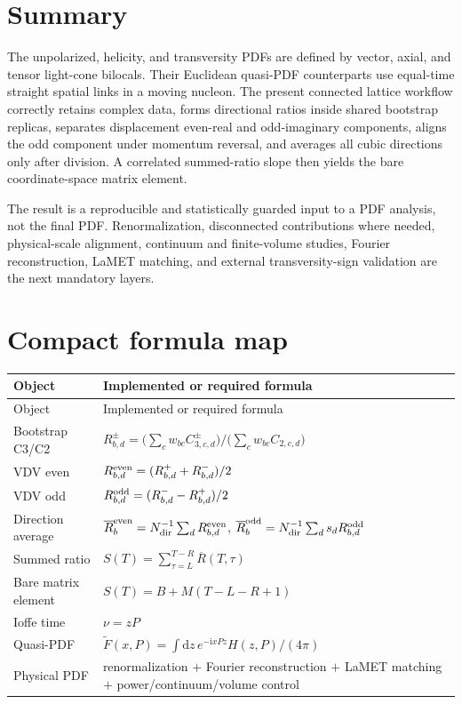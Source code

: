 \documentclass[11pt]{article}
\numberwithin{equation}{section}
\newcommand{\ii}{\mathrm{i}}
\newcommand{\dd}{\mathrm{d}}
\begin{document}
\section{Summary}

The unpolarized, helicity, and transversity PDFs are defined by vector, axial,
and tensor light-cone bilocals.  Their Euclidean quasi-PDF counterparts use
equal-time straight spatial links in a moving nucleon.  The present connected
lattice workflow correctly retains complex data, forms directional ratios
inside shared bootstrap replicas, separates displacement even-real and
odd-imaginary components, aligns the odd component under momentum reversal,
and averages all cubic directions only after division.  A correlated
summed-ratio slope then yields the bare coordinate-space matrix element.

The result is a reproducible and statistically guarded input to a PDF analysis,
not the final PDF.  Renormalization, disconnected contributions where needed,
physical-scale alignment, continuum and finite-volume studies, Fourier
reconstruction, LaMET matching, and external transversity-sign validation are
the next mandatory layers.

\appendix

\section{Compact formula map}

\begin{longtable}{p{}p{}}
\toprule
Object & Implemented or required formula\\
\midrule
\endfirsthead
\toprule
Object & Implemented or required formula\\
\midrule
\endhead
Bootstrap C3/C2 &
$R_{b,d}^{\pm}=\bigl(\sum_cw_{bc}C_{3,c,d}^{\pm}\bigr)/
\bigl(\sum_cw_{bc}C_{2,c,d}\bigr)$\\
VDV even & $R_{b,d}^{\rm even}=(R_{b,d}^{+}+R_{b,d}^{-})/2$\\
VDV odd & $R_{b,d}^{\rm odd}=(R_{b,d}^{-}-R_{b,d}^{+})/2$\\
Direction average &
$\overline R_{b}^{\rm even}=N_{\rm dir}^{-1}\sum_dR_{b,d}^{\rm even}$,
$\overline R_{b}^{\rm odd}=N_{\rm dir}^{-1}\sum_ds_dR_{b,d}^{\rm odd}$\\
Summed ratio & $S(T)=\sum_{\tau=L}^{T-R}\overline R(T,\tau)$\\
Bare matrix element & $S(T)=B+M(T-L-R+1)$\\
Ioffe time & $\nu=zP$\\
Quasi-PDF & $\widetilde F(x,P)=\int \dd z\,e^{-\ii xPz}H(z,P)/(4\pi)$\\
Physical PDF & renormalization $+$ Fourier reconstruction $+$ LaMET matching
$+$ power/continuum/volume control\\
\bottomrule
\end{longtable}
\end{document}

